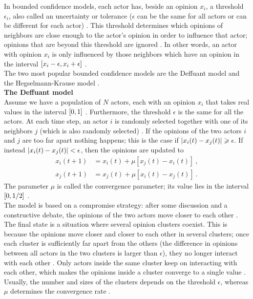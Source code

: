 \documentclass[11 pt , letterpaper , twoside , openright]{book}
\begin{document}
In bounded confidence models, each actor has, beside an opinion $x_i$, a threshold $\epsilon_i$, also called an uncertainty or tolerance ($\epsilon$ can be the same for all actors or can be different for each actor) \cite{Castellano2009}\cite{Deffuant2006}. This threshold determines which opinions of neighbors are close enough to the actor's opinion in order to influence that actor; opinions that are beyond this threshold are ignored \cite{Deffuant2006}. In other words, an actor with opinion $x_i$ is only influenced by those neighbors which have an opinion in the interval $\interval{x_i-\epsilon}{x_i+\epsilon}$ \cite{Castellano2009}. \\
\newline
The two most popular bounded confidence models are the Deffuant model and the Hegselmann-Krause model \cite{Castellano2009}. \\
\newline
\textbf{The Deffuant model}\\
\newline
Assume we have a population of $N$ actors, each with an opinion $x_i$ that takes real values in the interval $\interval{0}{1}$ \cite{Castellano2009}. Furthermore, the threshold $\epsilon$ is the same for all the actors. At each time step, an actor $i$ is randomly selected together with one of its neighbors $j$ (which is also randomly selected) \cite{Castellano2009}. If the opinions of the two actors $i$ and $j$ are too far apart nothing happens; this is the case if $\abs{x_i(t) - x_j(t)} \geqslant \epsilon$. If instead $\abs{x_i(t) - x_j(t)} < \epsilon$, then the opinions are updated to \cite{Castellano2009}\cite{Deffuant2000}
\begin{equation}
\begin{split}
	x_i(t+1) &= x_i(t) + \mu [x_j(t) - x_i(t)] \ ,\\
	x_j(t+1) &= x_j(t) + \mu [x_i(t) - x_j(t)] \ .
\end{split}
\end{equation}
The parameter $\mu$ is called the convergence parameter; its value lies in the interval $\interval{0}{1/2}$ \cite{Castellano2009}. \\
\newline
The model is based on a compromise strategy: after some discussion and a constructive debate, the opinions of the two actors move closer to each other \cite{Castellano2009}. The final state is a situation where several opinion clusters coexist. This is because the opinions move closer and closer to each other in several clusters; once each cluster is sufficiently far apart from the others (the difference in opinions between all actors in the two clusters is larger than $\epsilon$), they no longer interact with each other \cite{Castellano2009}. Only actors inside the same cluster keep on interacting with each other, which makes the opinions inside a cluster converge to a single value \cite{Castellano2009}. Usually, the number and sizes of the clusters depends on the threshold $\epsilon$, whereas $\mu$ determines the convergence rate \cite{Castellano2009}.\\
\end{document}
